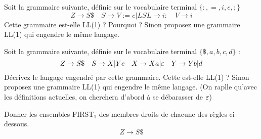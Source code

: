 \documentclass[french]{article}
\begin{document}
\begin{exo}
    Soit la grammaire suivante, définie sur le vocabulaire terminal \(\{:,=,i,e,;\}\)
    \[Z\to S\$\quad S\to V:=e|LS L\to i:\quad V\to i\]
    Cette grammaire est-elle LL(1) ? Pourquoi ? Sinon proposez une grammaire LL(1) qui
    engendre le même langage.
\end{exo}

\begin{exo}
    Soit la grammaire suivante, définie sur le vocabulaire terminal \(\{\$,a,b,c,d\}\) :
    \[Z\to S\$\quad S\to X|Yc\quad X\to Xa|\varepsilon\quad Y\to Yb|d\]
    Décrivez le langage engendré par cette grammaire. Cette est-elle LL(1) ? Sinon proposez une
    grammaire LL(1) qui engendre le même langage. (On raplle qu'avec les définitions actuelles, on
    cherchera d'abord à se débarasser de \(\varepsilon\))
\end{exo}

\begin{exo}
    Donner les ensembles FIRST\(_1\) des membres droits de chacune des règles ci-dessous.
    \[Z\to S\$\]
\end{exo}
\end{document}
